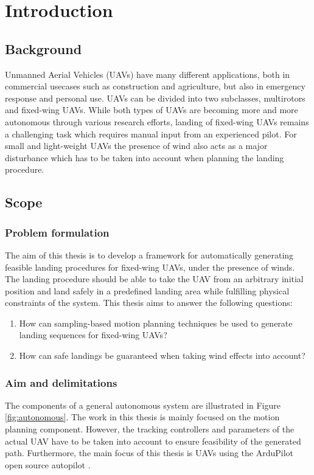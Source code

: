 \chapter{Introduction}

\section{Background}
Unmanned Aerial Vehicles (UAVs) have many different applications, both in commercial usecases such as construction and agriculture, but also in emergency response and personal use. 
UAVs can be divided into two subclasses, multirotors and fixed-wing UAVs. 
While both types of UAVs are becoming more and more autonomous through various research efforts, landing of fixed-wing UAVs remains a challenging task which 
requires manual input from an experienced pilot. For small and light-weight UAVs the presence of wind also acts as a major disturbance which has to be taken into account when planning 
the landing procedure.
\section{Scope}
\subsection{Problem formulation}
The aim of this thesis is to develop a framework for automatically generating feasible 
landing procedures for fixed-wing UAVs, under the presence of winds. The landing procedure should be able to take the UAV 
from an arbitrary initial position and land safely in a predefined landing area while fulfilling physical constraints of the system. 
This thesis aims to answer the following questions:
\begin{enumerate}
    \item How can sampling-based motion planning techniques be used to generate landing sequences for fixed-wing UAVs?
    \item How can safe landings be guaranteed when taking wind effects into account?
\end{enumerate}
\subsection{Aim and delimitations}
The components of a general autonomous system are illustrated in Figure \ref{fig:autonomous}. The work in this thesis 
is mainly focused on the motion planning component. However, the tracking controllers and parameters of the actual UAV have to be taken into account 
to ensure feasibility of the generated path. Furthermore, the main focus of this thesis is UAVs using the ArduPilot open source autopilot \cite{arduplane}.

